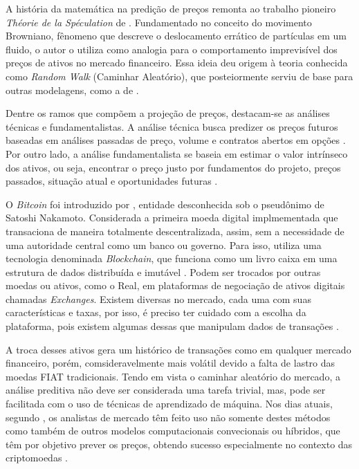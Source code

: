A história da matemática na predição de preços remonta ao trabalho pioneiro \textit{Théorie de la Spéculation} de \textcite{Bachelier} \cite{Courtault}. Fundamentado no conceito do movimento Browniano, 
fênomeno que descreve o deslocamento errático de partículas em um fluido, o autor o utiliza como analogia para o comportamento imprevisível dos preços de ativos no mercado financeiro. 
Essa ideia deu origem à teoria conhecida como \textit{Random Walk} (Caminhar Aleatório), que posteiormente serviu de base para outras modelagens, como a de \textcite{blacksholes}.

Dentre os ramos que compõem a projeção de preços, destacam-se as análises técnicas e fundamentalistas.
A análise técnica busca predizer os preços futuros baseadas em análises passadas de preço, volume e contratos abertos em opções \cite{Pring}.
Por outro lado, a análise fundamentalista se baseia em estimar o valor intrínseco dos ativos, ou seja, encontrar o preço justo por fundamentos do projeto, preços passados, situação atual e oportunidades futuras \cite{Ahmed}.

O \textit{Bitcoin} foi introduzido por \textcite{Nakamoto}, entidade desconhecida sob o pseudônimo de Satoshi Nakamoto. 
Considerada a primeira moeda digital implmementada que transaciona de maneira totalmente descentralizada, assim, sem a necessidade de uma autoridade central como um banco ou governo. 
Para isso, utiliza uma tecnologia denominada \textit{Blockchain}, que funciona como um livro caixa em uma estrutura de dados distribuída e imutável \cite{Ledger}. Podem ser trocados por outras moedas ou ativos, como o Real, em plataformas de negociação de ativos digitais chamadas \textit{Exchanges}.
Existem diversas no mercado, cada uma com suas características e taxas, por isso, é preciso ter cuidado com a escolha da plataforma, pois existem algumas dessas que manipulam dados de transações \cite{FakeExchanges}.

A troca desses ativos gera um histórico de transações como em qualquer mercado financeiro,
porém, comsideravelmente mais volátil devido a falta de lastro das moedas FIAT tradicionais. 
Tendo em vista o caminhar aleatório do mercado, a análise preditiva não deve ser considerada uma tarefa trivial, mas, pode ser facilitada com o uso de técnicas de aprendizado de máquina.
Nos dias atuais, segundo \textcite{Fang}, os analistas de mercado têm feito uso não somente destes métodos como também de outros modelos computacionais convecionais ou híbridos, que têm por objetivo prever os preços, obtendo sucesso especialmente no contexto das criptomoedas \cite{Atsalakis}.

